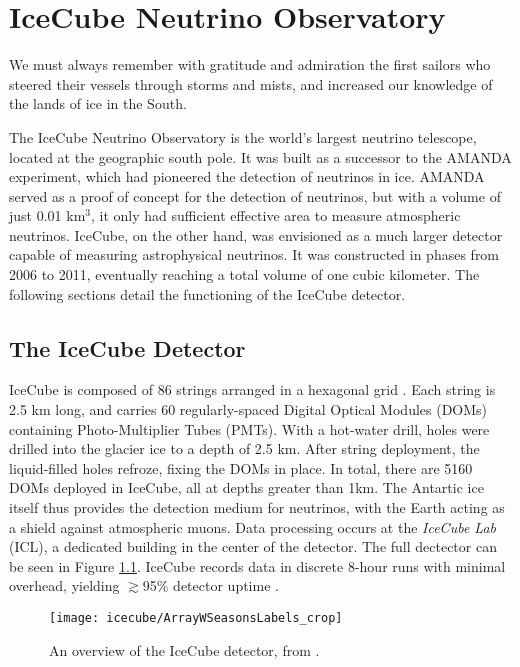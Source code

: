 \setchapterpreamble[u]{\margintoc}
\chapter{IceCube Neutrino Observatory}
\begin{fquote} We must always remember with gratitude and admiration the first sailors who steered their vessels through storms and mists, and increased our knowledge of the lands of ice in the South. 
\end{fquote}
The IceCube Neutrino Observatory is the world's largest neutrino telescope, located at the geographic south pole. It was built as a successor to the AMANDA experiment, which had pioneered the detection of neutrinos in ice. AMANDA served as a proof of concept for the detection of neutrinos, but with a volume of just 0.01 km$^{3}$, it only had sufficient effective area to measure atmospheric neutrinos. IceCube, on the other hand, was envisioned as a much larger detector capable of measuring astrophysical neutrinos. It was constructed in phases from 2006 to 2011, eventually reaching a total volume of one cubic kilometer. The following sections detail the functioning of the IceCube detector.

\section{The IceCube Detector}

IceCube is composed of 86 strings arranged in a hexagonal grid . Each string is 2.5 km long, and carries 60 regularly-spaced Digital Optical Modules (DOMs) containing Photo-Multiplier Tubes (PMTs). With a hot-water drill, holes were drilled into the glacier ice to a depth of 2.5 km. After string deployment, the liquid-filled holes refroze, fixing the DOMs in place. In total, there are 5160 DOMs deployed in IceCube, all at depths greater than 1km. The Antartic ice itself thus provides the detection medium for neutrinos, with the Earth acting as a shield against atmospheric muons. Data processing occurs at the \emph{IceCube Lab} (ICL), a dedicated building in the center of the detector. The full dectector can be seen in Figure \ref{fig:ic_detector}. IceCube records data in discrete 8-hour runs with minimal overhead, yielding $\gtrsim$95\% detector uptime \cite{icecube_detector_17}.

\begin{figure}
	\centering \texttt{[image: icecube/ArrayWSeasonsLabels\_crop]}
	\caption{An overview of the IceCube detector, from \cite{icecube_detector_17}.}
	\label{fig:ic_detector}
\end{figure}

